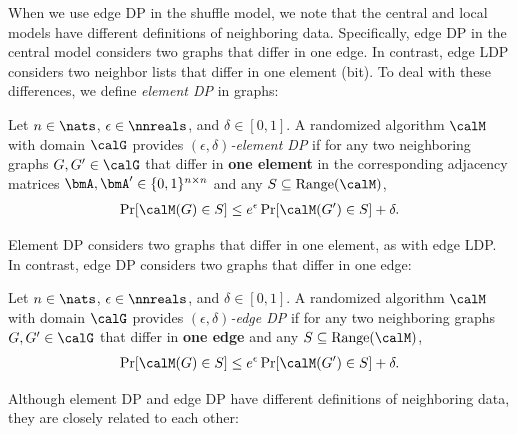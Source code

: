 When we use edge DP in the shuffle model, we note that the central and local models have different definitions of neighboring data. 
Specifically, edge DP in the central model \cite{Raskhodnikova_Encyclopedia16} considers two graphs that differ in one edge. 
In contrast, edge LDP 
\cite{Qin_CCS17} considers two neighbor lists that differ in one element (bit). 
To deal with these differences, we define \textit{element DP} in graphs:

\begin{definition}  \label{def:element_DP} 
Let $n \in \nats$, $\epsilon \in \nnreals$, and $\delta \in [0,1]$. 
A randomized algorithm $\calM$ with domain $\calG$ provides \emph{$(\epsilon, \delta)$-element DP} 
if for any two neighboring graphs $G, G' \in \calG$ that differ in \textbf{one element} in the corresponding adjacency matrices $\bmA, \bmA' \in \{0,1\}^{n \times n}$
and any $S \subseteq \mathrm{Range}(\calM)$, 
\begin{align}
\Pr[\calM(G) \in S] \leq e^\epsilon \Pr[\calM(G') \in S] + \delta.
\label{eq:element_DP}
\end{align}
\end{definition}

Element DP considers two graphs that differ in one element, as with edge LDP. 
In contrast, edge DP \cite{Raskhodnikova_Encyclopedia16} considers two graphs that differ in one edge: 

\begin{definition}  \label{def:edge_DP} 
Let $n \in \nats$, $\epsilon \in \nnreals$, and $\delta \in [0,1]$. 
A randomized algorithm $\calM$ with domain $\calG$ provides \emph{$(\epsilon, \delta)$-edge DP} 
if for any two neighboring graphs $G, G' \in \calG$ that differ in \textbf{one edge} and any $S \subseteq \mathrm{Range}(\calM)$, 
\begin{align}
\Pr[\calM(G) \in S] \leq e^\epsilon \Pr[\calM(G') \in S] + \delta.
\label{eq:edge_DP}
\end{align}
\end{definition}

Although element DP and edge DP have different definitions of neighboring data, they are closely related to each other:

